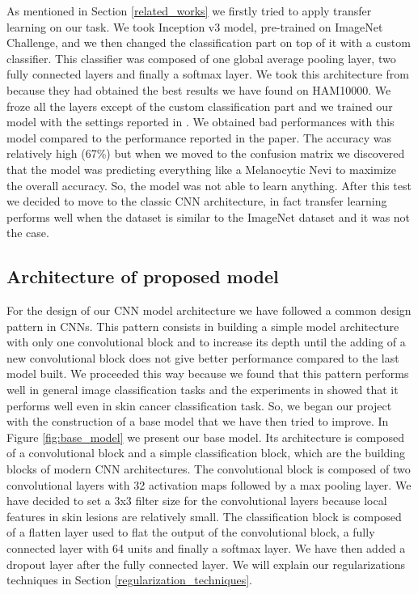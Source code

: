 		As mentioned in Section \ref{related_works} we firstly tried to apply transfer learning on our task. We took Inception v3 model, pre-trained on ImageNet Challenge, and we then changed the classification part on top of it with a custom classifier. This classifier was composed of one global average pooling layer, two fully connected layers and finally a softmax layer. We took this architecture from \cite{article2} because they had obtained the best results we have found on HAM10000. We froze all the layers except of the custom classification part and we trained our model with the settings reported in \cite{article2}. We obtained bad performances with this model compared to the performance reported in the paper. The accuracy was relatively high (67\%) but when we moved to the confusion matrix we discovered that the model was predicting everything like a Melanocytic Nevi to maximize the overall accuracy. So, the model was not able to learn anything. After this test we decided to move to the classic CNN architecture, in fact transfer learning performs well when the dataset is similar to the ImageNet dataset and it was not the case.
		
	\subsection{Architecture of proposed model}
	
		For the design of our CNN model architecture we have followed a common design pattern in CNNs. This pattern consists in building a simple model architecture with only one convolutional block and to increase its depth until the adding of a new convolutional block does not give better performance compared to the last model built. We proceeded this way because we found that this pattern performs well in general image classification tasks and the experiments in \cite{article3} showed that it performs well even in skin cancer classification task. So, we began our project with the construction of a base model that we have then tried to improve. In Figure \ref{fig:base_model} we present our base model. Its architecture is composed of a convolutional block and a simple classification block, which are the building blocks of modern CNN architectures. The convolutional block is composed of two convolutional layers with 32 activation maps followed by a max pooling layer. We have decided to set a 3x3 filter size for the convolutional layers because local features in skin lesions are relatively small. The classification block is composed of a flatten layer used to flat the output of the convolutional block, a fully connected layer with 64 units and finally a softmax layer. We have then added a dropout layer after the fully connected layer. We will explain our regularizations techniques in Section \ref{regularization_techniques}. 
		
